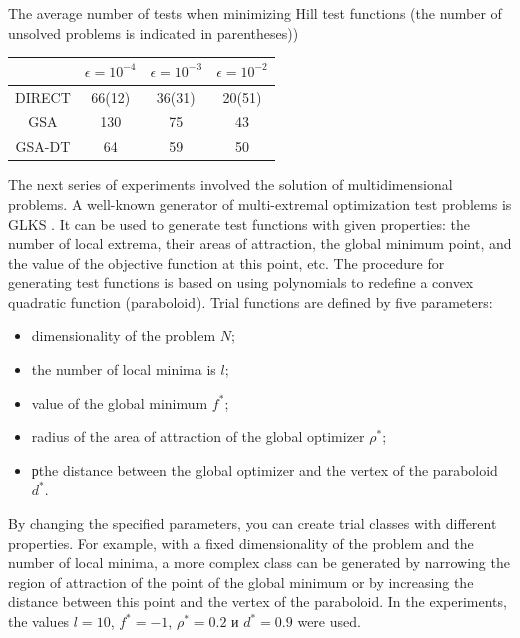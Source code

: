 \documentclass[entropy,article,submit,moreauthors,pdftex]{Definitions/mdpi}
\begin{document}
\begin{specialtable}[H] 
	\caption{The average number of tests when minimizing Hill test functions (the number of unsolved problems is indicated in parentheses))}\label{table:average_Hill}
	\center
\begin{tabular}{cccc}
\toprule
        & \textbf{$\epsilon = 10^{-4}$} & \textbf{$\epsilon = 10^{-3}$} & \textbf{$\epsilon = 10^{-2}$} \\
\midrule					  
DIRECT                & 66(12) & 36(31)  & 20(51)  \\
GSA                   & 130    & 75      & 43      \\
GSA-DT                & 64     & 59      & 50      \\
\bottomrule
\end{tabular}
\end{specialtable}

The next series of experiments involved the solution of multidimensional problems. 
A well-known generator of multi-extremal optimization test problems is GLKS  \cite{Gaviano2003}. It can be used to generate test functions with given properties: the number of local extrema, their areas of attraction, the global minimum point, and the value of the objective function at this point, etc. The procedure for generating test functions is based on using polynomials to redefine a convex quadratic function (paraboloid). Trial functions are defined by five parameters:
\begin{itemize}
	\item dimensionality of the problem  $N$;
	\item the number of local minima is $l$;
	\item value of the global minimum $f^*$;
	\item radius of the area of attraction of the global optimizer $\rho^*$;
	\item рthe distance between the global optimizer and the vertex of the paraboloid $d^*$.
\end{itemize}
By changing the specified parameters, you can create trial classes with different properties. For example, with a fixed dimensionality of the problem and the number of local minima, a more complex class can be generated by narrowing the region of attraction of the point of the global minimum or by increasing the distance between this point and the vertex of the paraboloid. 
In the experiments, the values $l=10$, $f^*=-1$, $\rho^*=0.2$ и $d^*=0.9$ were used.
\end{document}
